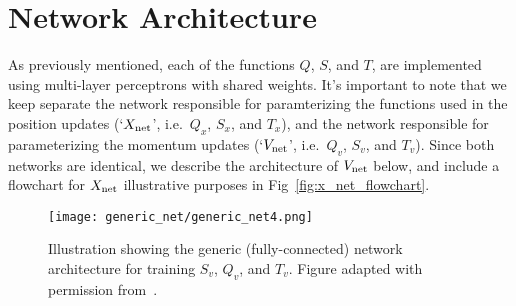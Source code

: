\documentclass[../main.tex]{subfiles}
\begin{document}
\section{Network Architecture}%
\label{subsec:l2hmc_network}
As previously mentioned, each of the functions $Q$, $S$, and $T$, are
implemented using multi-layer perceptrons with shared weights.
%
It's important to note that we keep separate the network responsible for
paramterizing the functions used in the position updates (`${X_{\mathrm{net}}}$', i.e.\
$Q_x$, $S_x$, and $T_x$), and the network responsible for parameterizing the
momentum updates (`${V_{\mathrm{net}}}$', i.e.\ $Q_v$, $S_v$, and $T_v$).
%
Since both networks are identical, we describe the architecture of ${V_{\mathrm{net}}}$
below, and include a flowchart for ${X_{\mathrm{net}}}$ illustrative purposes in
Fig~\ref{fig:x_net_flowchart}.
%
%
\begin{figure}[htpb]
  \centering
  \texttt{[image: generic\_net/generic\_net4.png]}
  \caption{Illustration showing the generic (fully-connected) network
    architecture for training $S_v$, $Q_v$, and $T_v$. Figure adapted
		with permission from~\cite{joeyl2hmc}.}%
\label{fig:generic_net}
\end{figure}
%
\end{document}
